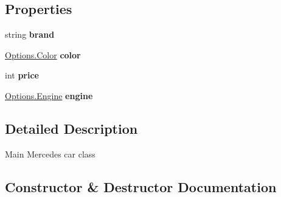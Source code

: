 \subsection*{Properties}
\begin{DoxyCompactItemize}
\item 
\mbox{\label{class_project_app_1_1_mercedes_car_a5d8034c474ac1de401fa448c5cd6f1e6}} 
string {\bfseries brand}
\item 
\mbox{\label{class_project_app_1_1_mercedes_car_a14749a8e5fe3de1cc5e93e07bf61c494}} 
\mbox{\hyperlink{class_project_app_1_1_options_aaa68b08af20deeebf73e6bc6de725c44}{Options.\+Color}} {\bfseries color}
\item 
\mbox{\label{class_project_app_1_1_mercedes_car_ac3eff4b8b7ad8e825be067afcff8f12a}} 
int {\bfseries price}
\item 
\mbox{\label{class_project_app_1_1_mercedes_car_ad85c8b26e57645b2dbe0cc05bf021029}} 
\mbox{\hyperlink{class_project_app_1_1_options_a95e313182e8122da719f7c8caefcc88d}{Options.\+Engine}} {\bfseries engine}
\end{DoxyCompactItemize}


\subsection{Detailed Description}
Main Mercedes car class 



\subsection{Constructor \& Destructor Documentation}
\mbox{\label{class_project_app_1_1_mercedes_car_ad497ef3e7b586d22124c25240ed84dfc}} 
